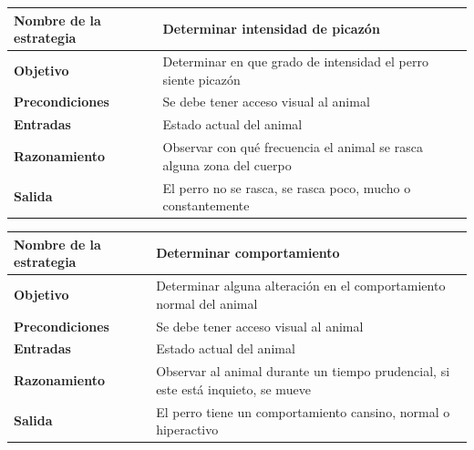 \documentclass[a4paper,table,xcdraw]{article}
\begin{document}
\begin{longtable}{|l|l|}
\hline
\textbf{Nombre de la estrategia} & Determinar intensidad de picazón                                      \\ \hline
\endhead
%
\textbf{Objetivo}                & Determinar en que grado de intensidad el perro siente picazón         \\ \hline
\textbf{Precondiciones}          & Se debe tener acceso visual al animal                                 \\ \hline
\textbf{Entradas}                & Estado actual del animal                                              \\ \hline
\textbf{Razonamiento}            & Observar con qué frecuencia el animal se rasca alguna zona del cuerpo \\ \hline
\textbf{Salida}                  & El perro no se rasca, se rasca poco, mucho o constantemente           \\ \hline
\end{longtable}

\begin{longtable}{|l|l|}
\hline
\textbf{Nombre de la estrategia} & Determinar comportamiento                                                        \\ \hline
\endhead
%
\textbf{Objetivo}                & Determinar alguna alteración en el comportamiento normal del animal              \\ \hline
\textbf{Precondiciones}          & Se debe tener acceso visual al animal                                            \\ \hline
\textbf{Entradas}                & Estado actual del animal                                                         \\ \hline
\textbf{Razonamiento}            & Observar al animal durante un tiempo prudencial, si este está inquieto, se mueve \\ \hline
\textbf{Salida}                  & El perro tiene un comportamiento cansino, normal o hiperactivo                   \\ \hline
\end{longtable}
\end{document}

